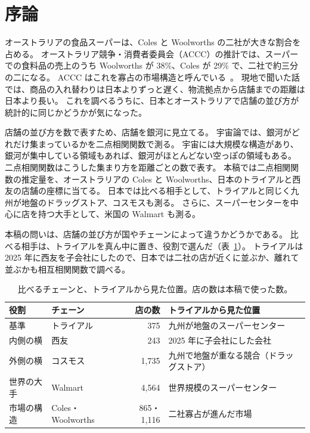 \documentclass[a4paper,11pt]{ltjsarticle}
\begin{document}
\section{序論}
\label{sec:intro}

オーストラリアの食品スーパーは、Coles と Woolworths の二社が大きな割合を占める。
オーストラリア競争・消費者委員会（ACCC）の推計では、スーパーでの食料品の売上のうち Woolworths が 38\%、Coles が 29\% で、二社で約三分の二になる。
ACCC はこれを寡占の市場構造と呼んでいる~\cite{ACCC2025}。
現地で聞いた話では、商品の入れ替わりは日本よりずっと遅く、物流拠点から店舗までの距離は日本より長い。
これを調べるうちに、日本とオーストラリアで店舗の並び方が統計的に同じかどうかが気になった。

店舗の並び方を数で表すため、店舗を銀河に見立てる。
宇宙論では、銀河がどれだけ集まっているかを二点相関関数で測る。
宇宙には大規模な構造があり、銀河が集中している領域もあれば、銀河がほとんどない空っぽの領域もある。
二点相関関数はこうした集まり方を距離ごとの数で表す。
本稿では二点相関関数の推定量を、オーストラリアの Coles と Woolworths、日本のトライアルと西友の店舗の座標に当てる。
日本では比べる相手として、トライアルと同じく九州が地盤のドラッグストア、コスモスも測る。
さらに、スーパーセンターを中心に店を持つ大手として、米国の Walmart も測る。

本稿の問いは、店舗の並び方が国やチェーンによって違うかどうかである。
比べる相手は、トライアルを真ん中に置き、役割で選んだ（表~\ref{tab:chains}）。
トライアルは 2025 年に西友を子会社にしたので、日本では二社の店が近くに並ぶか、離れて並ぶかも相互相関関数で調べる。
\begin{table}[t]
  \centering
  \caption{比べるチェーンと、トライアルから見た位置。店の数は本稿で使った数。}
  \label{tab:chains}
  \small
  \begin{tabular}{llrl}
    \toprule
    役割 & チェーン & 店の数 & トライアルから見た位置 \\
    \midrule
    基準 & トライアル & 375 & 九州が地盤のスーパーセンター \\
    内側の横 & 西友 & 243 & 2025 年に子会社にした会社 \\
    外側の横 & コスモス & 1,735 & 九州で地盤が重なる競合（ドラッグストア） \\
    世界の大手 & Walmart & 4,564 & 世界規模のスーパーセンター \\
    市場の構造 & Coles・Woolworths & 865・1,116 & 二社寡占が進んだ市場 \cite{ACCC2025} \\
    \bottomrule
  \end{tabular}
\end{table}
\end{document}
